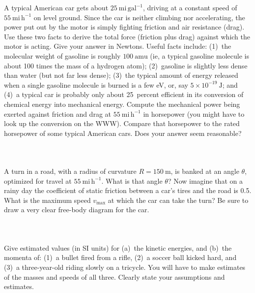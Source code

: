 \documentclass[12pt]{article}
\newcounter{problem}
\begin{document}
A typical American car gets about $25~\mathrm{mi\,gal^{-1}}$, driving
at a constant speed of $55~\mathrm{mi\,h^{-1}}$ on level ground.
Since the car is neither climbing nor accelerating, the power put out
by the motor is simply fighting friction and air resistance (drag).
Use these two facts to derive the total force (friction plus drag)
against which the motor is acting.  Give your answer in Newtons.
Useful facts include: (1)~the molecular weight of gasoline is roughly
$100~\mathrm{amu}$ (ie, a typical gasoline molecule is about 100 times
the mass of a hydrogen atom); (2)~gasoline is slightly less dense than
water (but not far less dense); (3)~the typical amount of energy
released when a single gasoline molecule is burned is a few eV, or,
say $5\times 10^{-19}~\mathrm{J}$; and (4)~a typical car is probably
only about 25~percent efficient in its conversion of chemical energy
into mechanical energy.  Compute the mechanical power being exerted
against friction and drag at $55~\mathrm{mi\,h^{-1}}$ in horsepower
(you might have to look up the conversion on the WWW).  Compare that
horsepower to the rated horsepower of some typical American cars.
Does your answer seem reasonable?

\paragraph{\problemname~\theproblem}

A turn in a road, with a radius of curvature $R=150~\mathrm{m}$, is
banked at an angle $\theta$, optimized for travel at
$55~\mathrm{mi\,h^{-1}}$.  What is that angle $\theta$?  Now imagine
that on a rainy day the coefficient of static friction between a car's
tires and the road is 0.5.  What is the maximum speed $v_\mathrm{max}$
at which the car can take the turn?  Be sure to draw a very clear
free-body diagram for the car.

\paragraph{\problemname~\theproblem}

Give estimated values (in SI units) for (a)~the kinetic energies, and
(b)~the momenta of: (1)~a bullet fired from a rifle, (2)~a soccer ball
kicked hard, and (3)~a three-year-old riding slowly on a tricycle.
You will have to make estimates of the masses and speeds of all three.
Clearly state your assumptions and estimates.
\end{document}
